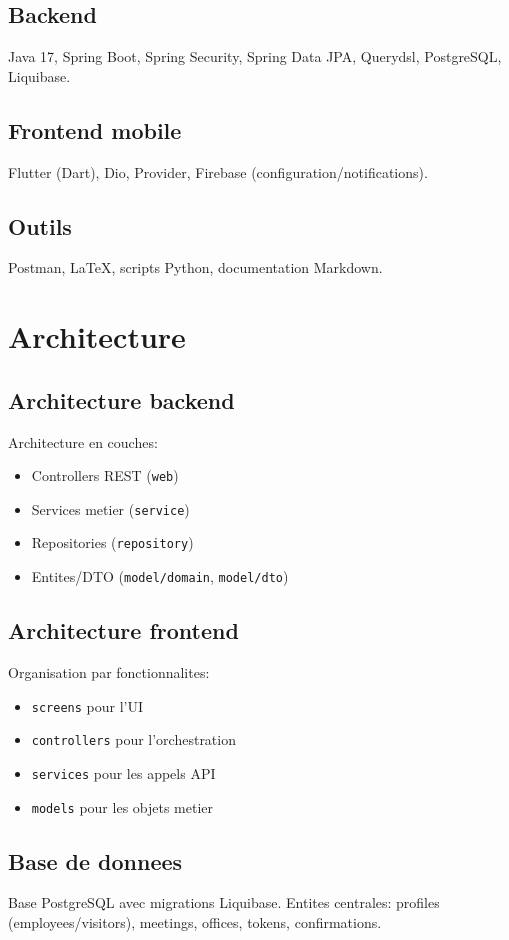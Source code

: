 \documentclass[12pt,a4paper]{article}
\begin{document}
\subsection{Backend}
Java 17, Spring Boot, Spring Security, Spring Data JPA, Querydsl, PostgreSQL, Liquibase.
\subsection{Frontend mobile}
Flutter (Dart), Dio, Provider, Firebase (configuration/notifications).
\subsection{Outils}
Postman, LaTeX, scripts Python, documentation Markdown.

\section{Architecture}
\subsection{Architecture backend}
Architecture en couches:
\begin{itemize}
  \item Controllers REST (\texttt{web})
  \item Services metier (\texttt{service})
  \item Repositories (\texttt{repository})
  \item Entites/DTO (\texttt{model/domain}, \texttt{model/dto})
\end{itemize}
\subsection{Architecture frontend}
Organisation par fonctionnalites:
\begin{itemize}
  \item \texttt{screens} pour l'UI
  \item \texttt{controllers} pour l'orchestration
  \item \texttt{services} pour les appels API
  \item \texttt{models} pour les objets metier
\end{itemize}
\subsection{Base de donnees}
Base PostgreSQL avec migrations Liquibase. Entites centrales: profiles (employees/visitors), meetings, offices, tokens, confirmations.
\end{document}
